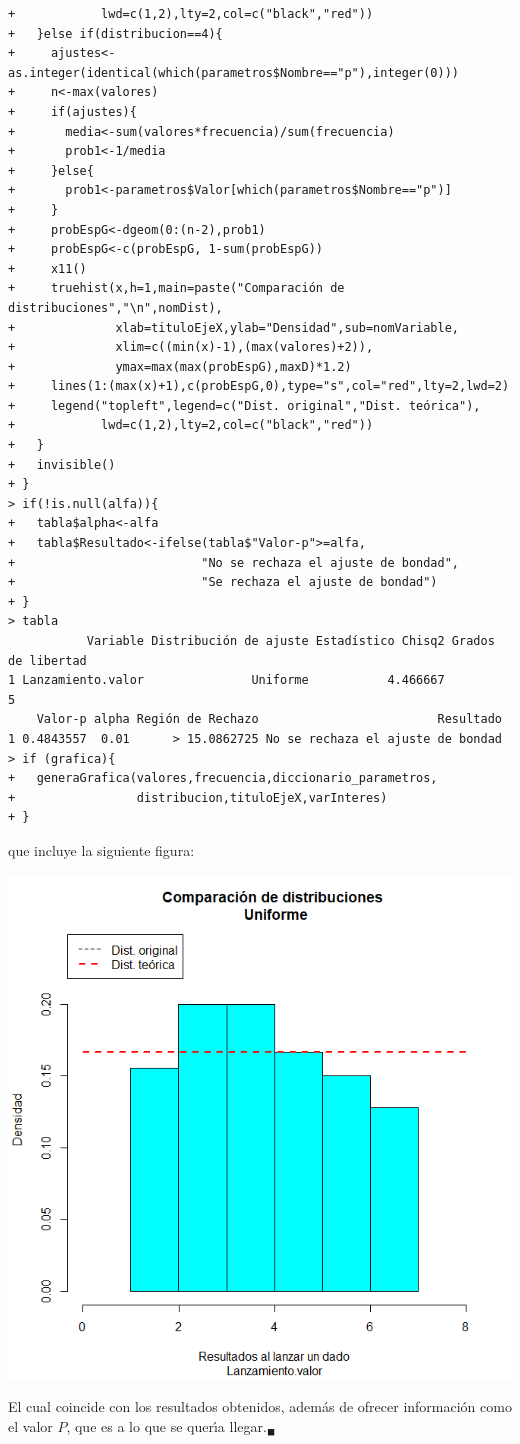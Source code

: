 \begin{solucion}
\begin{verbatim}
+            lwd=c(1,2),lty=2,col=c("black","red"))
+   }else if(distribucion==4){
+     ajustes<-as.integer(identical(which(parametros$Nombre=="p"),integer(0)))
+     n<-max(valores)
+     if(ajustes){
+       media<-sum(valores*frecuencia)/sum(frecuencia)
+       prob1<-1/media
+     }else{
+       prob1<-parametros$Valor[which(parametros$Nombre=="p")]
+     }
+     probEspG<-dgeom(0:(n-2),prob1)
+     probEspG<-c(probEspG, 1-sum(probEspG))
+     x11()
+     truehist(x,h=1,main=paste("Comparación de distribuciones","\n",nomDist),
+              xlab=tituloEjeX,ylab="Densidad",sub=nomVariable,
+              xlim=c((min(x)-1),(max(valores)+2)),
+              ymax=max(max(probEspG),maxD)*1.2)
+     lines(1:(max(x)+1),c(probEspG,0),type="s",col="red",lty=2,lwd=2)
+     legend("topleft",legend=c("Dist. original","Dist. teórica"),
+            lwd=c(1,2),lty=2,col=c("black","red"))
+   }
+   invisible()
+ }
> if(!is.null(alfa)){
+   tabla$alpha<-alfa
+   tabla$Resultado<-ifelse(tabla$"Valor-p">=alfa,
+                          "No se rechaza el ajuste de bondad",
+                          "Se rechaza el ajuste de bondad")
+ }
> tabla
           Variable Distribución de ajuste Estadístico Chisq2 Grados de libertad
1 Lanzamiento.valor               Uniforme           4.466667                  5
    Valor-p alpha Región de Rechazo                         Resultado
1 0.4843557  0.01      > 15.0862725 No se rechaza el ajuste de bondad
> if (grafica){
+   generaGrafica(valores,frecuencia,diccionario_parametros,
+                 distribucion,tituloEjeX,varInteres)
+ }
 \end{verbatim}
 \vspace{-0.5cm}
 que incluye la siguiente figura:
 \begin{center}
  \includegraphics[scale=0.35]{Problema_79.png}
 \end{center}
 El cual coincide con los resultados obtenidos,
 adem\'as de ofrecer informaci\'on como el valor $P$,
 que es a lo que se quer\'{\i}a llegar.${}_{\blacksquare}$
\end{solucion}
